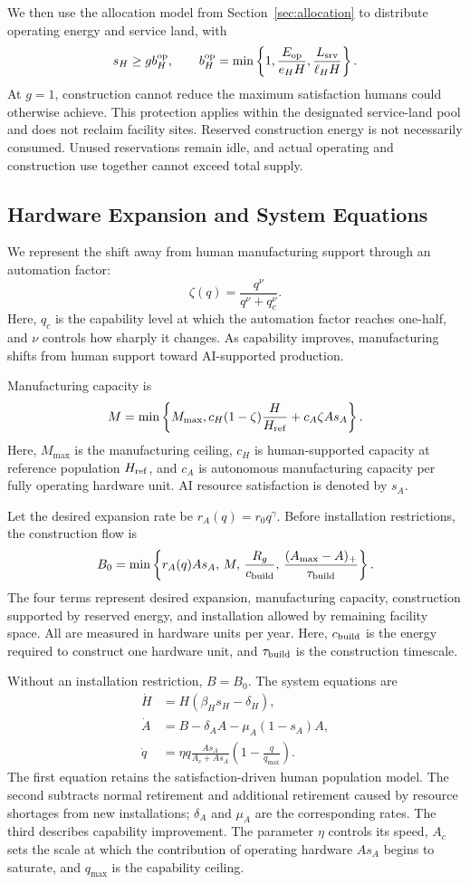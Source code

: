 \documentclass[12pt,a4paper]{article}
\theoremstyle{remark}
\newcommand{\Eop}{E_{\mathrm{op}}}
\newcommand{\Lservice}{L_{\mathrm{srv}}}
\begin{document}
We then use the allocation model from Section~\ref{sec:allocation} to distribute operating energy and service land, with
\[
s_H\ge gb_H^{\rm op},\qquad
b_H^{\rm op}=\min\left\{1,\frac{\Eop}{e_HH},\frac{\Lservice}{\ell_HH}\right\}.
\]
At $g=1$, construction cannot reduce the maximum satisfaction humans could otherwise achieve. This protection applies within the designated service-land pool and does not reclaim facility sites. Reserved construction energy is not necessarily consumed. Unused reservations remain idle, and actual operating and construction use together cannot exceed total supply.

\subsection{Hardware Expansion and System Equations}
We represent the shift away from human manufacturing support through an automation factor:
\[
\zeta(q)=\frac{q^\nu}{q^\nu+q_c^\nu}.
\]
Here, $q_c$ is the capability level at which the automation factor reaches one-half, and $\nu$ controls how sharply it changes. As capability improves, manufacturing shifts from human support toward AI-supported production.

Manufacturing capacity is
\[
M=\min\left\{M_{\max},c_H(1-\zeta)\frac{H}{H_{\rm ref}}+c_A\zeta As_A\right\}.
\]
Here, $M_{\max}$ is the manufacturing ceiling, $c_H$ is human-supported capacity at reference population $H_{\rm ref}$, and $c_A$ is autonomous manufacturing capacity per fully operating hardware unit. AI resource satisfaction is denoted by $s_A$.

Let the desired expansion rate be $r_A(q)=r_0q^\gamma$. Before installation restrictions, the construction flow is
\begin{equation}\label{eq:build}
B_0=\min\left\{r_A(q)As_A,\,M,\,\frac{R_g}{c_{\rm build}},\,
\frac{(A_{\max}-A)_+}{\tau_{\rm build}}\right\}.
\end{equation}
The four terms represent desired expansion, manufacturing capacity, construction supported by reserved energy, and installation allowed by remaining facility space. All are measured in hardware units per year. Here, $c_{\rm build}$ is the energy required to construct one hardware unit, and $\tau_{\rm build}$ is the construction timescale.

Without an installation restriction, $B=B_0$. The system equations are
\begin{align}
\dot H&=H(\beta_Hs_H-\delta_H),\label{eq:human}\\
\dot A&=B-\delta_AA-\mu_A(1-s_A)A,\label{eq:hardware}\\
\dot q&=\eta q\frac{As_A}{A_c+As_A}\left(1-\frac{q}{q_{\max}}\right).\label{eq:capability}
\end{align}
The first equation retains the satisfaction-driven human population model. The second subtracts normal retirement and additional retirement caused by resource shortages from new installations; $\delta_A$ and $\mu_A$ are the corresponding rates. The third describes capability improvement. The parameter $\eta$ controls its speed, $A_c$ sets the scale at which the contribution of operating hardware $As_A$ begins to saturate, and $q_{\max}$ is the capability ceiling.
\end{document}
